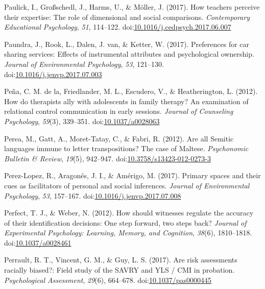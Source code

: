 \documentclass[english,man]{apa6}
\theoremstyle{definition}
\theoremstyle{definition}
\theoremstyle{definition}
\theoremstyle{remark}
\begin{document}
\hypertarget{ref-Paulick2017}{}
Paulick, I., Großschedl, J., Harms, U., \& Möller, J. (2017). How
teachers perceive their expertise: The role of dimensional and social
comparisons. \emph{Contemporary Educational Psychology}, \emph{51},
114--122.
doi:\href{https://doi.org/10.1016/j.cedpsych.2017.06.007}{10.1016/j.cedpsych.2017.06.007}

\hypertarget{ref-Paundra2017}{}
Paundra, J., Rook, L., Dalen, J. van, \& Ketter, W. (2017). Preferences
for car sharing services: Effects of instrumental attributes and
psychological ownership. \emph{Journal of Environmental Psychology},
\emph{53}, 121--130.
doi:\href{https://doi.org/10.1016/j.jenvp.2017.07.003}{10.1016/j.jenvp.2017.07.003}

\hypertarget{ref-DelaPena2012}{}
Peña, C. M. de la, Friedlander, M. L., Escudero, V., \& Heatherington,
L. (2012). How do therapists ally with adolescents in family therapy? An
examination of relational control communication in early sessions.
\emph{Journal of Counseling Psychology}, \emph{59}(3), 339--351.
doi:\href{https://doi.org/10.1037/a0028063}{10.1037/a0028063}

\hypertarget{ref-Perea2012}{}
Perea, M., Gatt, A., Moret-Tatay, C., \& Fabri, R. (2012). Are all
Semitic languages immune to letter transpositions? The case of Maltese.
\emph{Psychonomic Bulletin \& Review}, \emph{19}(5), 942--947.
doi:\href{https://doi.org/10.3758/s13423-012-0273-3}{10.3758/s13423-012-0273-3}

\hypertarget{ref-Perez-Lopez2017}{}
Perez-Lopez, R., Aragonés, J. I., \& Amérigo, M. (2017). Primary spaces
and their cues as facilitators of personal and social inferences.
\emph{Journal of Environmental Psychology}, \emph{53}, 157--167.
doi:\href{https://doi.org/10.1016/j.jenvp.2017.07.008}{10.1016/j.jenvp.2017.07.008}

\hypertarget{ref-Perfect2012}{}
Perfect, T. J., \& Weber, N. (2012). How should witnesses regulate the
accuracy of their identification decisions: One step forward, two steps
back? \emph{Journal of Experimental Psychology: Learning, Memory, and
Cognition}, \emph{38}(6), 1810--1818.
doi:\href{https://doi.org/10.1037/a0028461}{10.1037/a0028461}

\hypertarget{ref-Perrault2017}{}
Perrault, R. T., Vincent, G. M., \& Guy, L. S. (2017). Are risk
assessments racially biased?: Field study of the SAVRY and YLS / CMI in
probation. \emph{Psychological Assessment}, \emph{29}(6), 664--678.
doi:\href{https://doi.org/10.1037/pas0000445}{10.1037/pas0000445}
\end{document}
